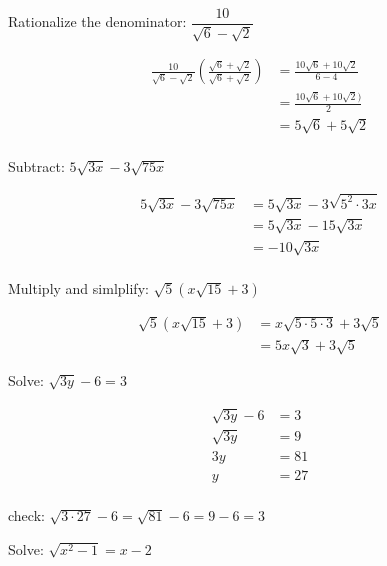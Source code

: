 \documentclass[fleqn,addpoints]{exam}
\begin{document}
\begin{questions}
\question
Rationalize the denominator: $\dfrac{10}{\sqrt{6} - \sqrt{2}}$

\begin{solution}

\begin{align*}
  \frac{10}{\sqrt{6} - \sqrt{2}} \left( \frac{\sqrt{6} + \sqrt{2}}{\sqrt{6} + \sqrt{2}} \right)
  &= \frac{10 \sqrt{6} + 10 \sqrt{2}}{6-4} \\
  &= \frac{10\sqrt{6} + 10\sqrt{2})}{2} \\
  &= 5\sqrt{6} + 5\sqrt{2} \\
\end{align*}
\end{solution}

\question
Subtract: $5 \sqrt{3x} - 3 \sqrt{75x}$

\begin{solution}
\begin{align*}
  5 \sqrt{3x} - 3 \sqrt{75x} &= 5 \sqrt{3x} - 3 \sqrt{5^2 \cdot 3x} \\
  &= 5 \sqrt{3x} - 15 \sqrt{3x} \\
  &= -10\sqrt{3x} \\
\end{align*}

\end{solution}

\question
Multiply and simlplify: $\sqrt{5}(x \sqrt{15} + 3)$

\begin{solution}
\begin{align*}
  \sqrt{5}(x \sqrt{15} + 3) &= x \sqrt{5 \cdot 5 \cdot 3} + 3\sqrt{5} \\
  &= 5x\sqrt{3} + 3\sqrt{5} 
\end{align*}
\end{solution}

\question
Solve: $\sqrt{3y} - 6 = 3$

\begin{solution}
\begin{align*}
  \sqrt{3y} - 6 &= 3 \\
  \sqrt{3y} &= 9 \\
  3y &= 81 \\
  y &= 27 \\
\end{align*}

check: $\sqrt{3 \cdot 27} - 6 = \sqrt{81} - 6 = 9 - 6 = 3$
\end{solution}

\question
Solve: $\sqrt{x^2-1}  = x - 2$


\end{questions}
\end{document}
